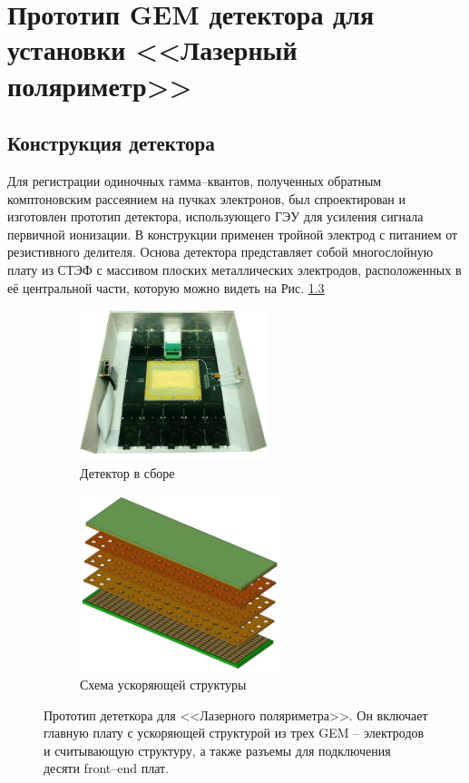 \vspace{24pt}
\chapter{Прототип GEM детектора для установки <<Лазерный поляриметр>>}
\label{sec:pol_examine}
\section{Конструкция детектора}
Для регистрации одиночных гамма--квантов, полученных обратным комптоновским рассеянием на пучках электронов, был спроектирован и изготовлен прототип детектора, использующего ГЭУ для усиления сигнала первичной ионизации. В конструкции применен тройной электрод с питанием от резистивного делителя. Основа детектора представляет собой многослойную плату из СТЭФ с массивом плоских металлических электродов, расположенных в её центральной части, которую можно видеть на Рис. \ref{fig:Detector_full_fig} 
\begin{figure}[H]
	\centering
	\begin{subfigure}{.5\textwidth}
		\centering
		\includegraphics[height = 5 cm, width= 5.5cm]{img/GEM_prototype.jpg}
		\caption{Детектор в сборе}
		\label{fig:Detector}
	\end{subfigure}%
	\begin{subfigure}{.5\textwidth}
		\centering
		\includegraphics[height = 5 cm, width= 5.8cm]{img/GEM_model.pdf}
		\caption{Схема ускоряющей структуры}
		\label{fig:GEM_structure}
	\end{subfigure}
	\caption{Прототип дететкора для <<Лазерного поляриметра>>. Он включает главную плату с ускоряющей структурой из трех GEM -- электродов и считывающую структуру, а также разъемы для подключения десяти front--end плат.}
	\label{fig:Detector_full_fig}
\end{figure}

